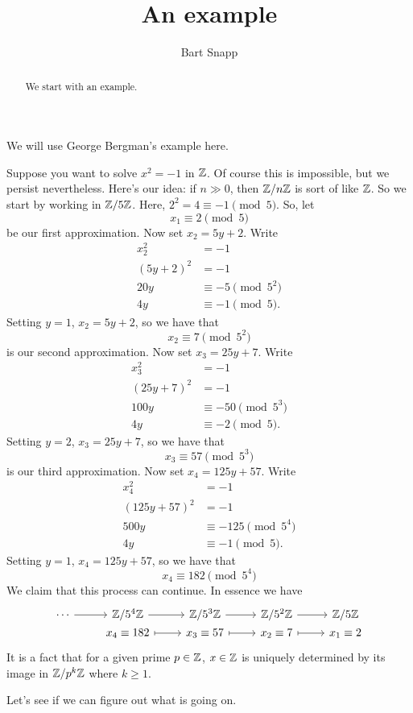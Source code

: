 \documentclass{ximera}
\author{Bart Snapp}
\title{An example}
\begin{document}
\begin{abstract}
  We start with an example. 
\end{abstract}
\maketitle

We will use George Bergman's example here.

Suppose you want to solve $x^2 =-1$ in $\mathbb Z$. Of course this is
impossible, but we persist nevertheless. Here's our idea: if $n\gg 0$,
then $\mathbb Z/n \mathbb Z$ is sort of like $\mathbb Z$. So we start by working in
$\mathbb Z/5\mathbb Z$. Here, $2^2 = 4 \equiv -1\pmod{5}$. So, let
\[
x_1\equiv 2\pmod{5}
\]
be our first approximation.  Now set $x_2 = 5 y +2$. Write
\begin{align*}
  x_2^2 &= -1 \\
  (5 y +2)^2 &= -1\\
  20y &\equiv -5 \pmod{5^2}\\
  4y &\equiv -1 \pmod{5}.
\end{align*}
Setting $y = 1$, $x_2 = 5y+2$, so we have that
\[
x_2 \equiv 7 \pmod{5^2}
\]
is our second approximation. Now set $x_3 = 25 y + 7$. Write
\begin{align*}
  x_3^2 &= -1\\
  (25 y + 7)^2 &= -1\\
  100y &\equiv -50 \pmod{5^3}\\
  4y &\equiv -2 \pmod{5}.
\end{align*}
Setting $y = 2$, $x_3= 25 y + 7$, so we have that
\[
x_3 \equiv 57 \pmod{5^3}
\]
is our third approximation. Now set $x_4 = 125 y + 57$. Write
\begin{align*}
x_4^2 &= -1\\
(125y + 57)^2 &=-1\\
500y &\equiv -125 \pmod{5^4}\\
4y &\equiv -1 \pmod{5}.
\end{align*}
Setting $y = 1$, $x_4 = 125y + 57$, so we have that
\[
x_4 \equiv 182 \pmod{5^4}
\]
We claim that this process can continue. In essence we have
\[
\begin{tikzcd}[row sep=0em,]
  \cdots \ar[r] & \Z/5^4\Z \ar[r] & \Z/5^3\Z \ar[r] & \Z/5^2\Z \ar[r] & \Z/5\Z \\
  & x_4\equiv 182 \ar[r,mapsto] & x_3\equiv 57 \ar[r,mapsto] & x_2\equiv 7 \ar[r,mapsto] &  x_1\equiv 2
\end{tikzcd}
\]
It is a fact that for a given prime $p\in \mathbb Z$, $x\in\mathbb Z$ is uniquely
determined by its image in $\mathbb Z/p^k\mathbb Z$ where $k\ge 1$.

Let's see if we can figure out what is going on.
\end{document}
